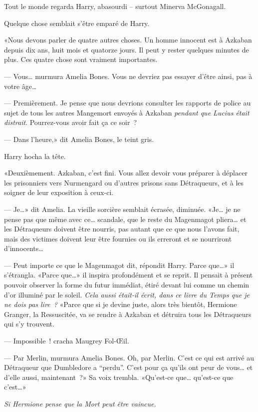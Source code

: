 Tout le monde regarda Harry, abasourdi -- surtout Minerva McGonagall.

Quelque chose semblait s'être emparé de Harry.

«Nous devons parler de quatre autres choses. Un homme innocent est à Azkaban depuis dix ans, huit mois et quatorze jours. Il peut y rester quelques minutes de plus. Ces quatre chose sont vraiment importantes.

--- Vous… murmura Amelia Bones. Vous ne devriez pas essayer d'être ainsi, pas à votre âge…

--- Premièrement. Je pense que nous devrions consulter les rapports de police au sujet de tous les autres Mangemort envoyés à Azkaban \emph{pendant que Lucius était distrait}. Pourrez-vous avoir fait ça ce soir~?

--- Dans l'heure,» dit Amelia Bones, le teint gris.

Harry hocha la tête.

«Deuxièmement. Azkaban, c'est fini. Vous allez devoir vous préparer à déplacer les prisonniers vers Nurmengard ou d'autres prisons sans Détraqueurs, et à les soigner de leur exposition à ceux-ci.

--- Je…» dit Amelia. La vieille sorcière semblait écrasée, diminuée. «Je… je ne pense pas que même avec ce… scandale, que le reste du Magenmagot pliera… et les Détraqueurs doivent être nourris, pas autant que ce que nous l'avons fait, mais des victimes doivent leur être fournies ou ils erreront et se nourriront d'innocents…

--- Peut importe ce que le Magenmagot dit, répondit Harry. Parce que…» il s'étrangla. «Parce que…» il inspira profondément et se reprit. Il pensait à présent pouvoir observer la forme du futur immédiat, étiré devant lui comme un chemin d'or illuminé par le soleil. \emph{Cela aussi était-il écrit, dans ce livre du Temps que je ne dois pas lire~?} «Parce que si je devine juste, alors très bientôt, Hermione Granger, la Ressuscitée, va se rendre à Azkaban et détruira tous les Détraqueurs qui s'y trouvent.

--- Impossible~! cracha Maugrey Fol-Œil.

--- Par Merlin, murmura Amelia Bones. Oh, par Merlin. C'est ce qui est arrivé au Détraqueur que Dumbledore a “perdu”. C'est pour ça qu'ils ont peur de vous… et d'elle aussi, maintenant~?» Sa voix trembla. «Qu'est-ce que… qu'est-ce que c'est…»

\emph{Si Hermione pense que la Mort peut être vaincue.}

